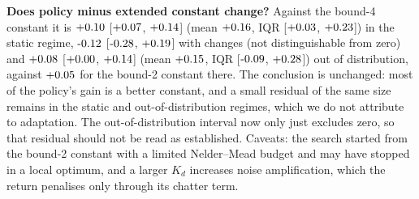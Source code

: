 \textbf{Does policy minus extended constant change?} Against the bound-4 constant it is $+0.10$ [$+0.07$, $+0.14$] (mean $+0.16$, IQR [$+0.03$, $+0.23$]) in the static regime, $\KdBoundChangesPpoBestConstantExtKdfourMed$ [$\KdBoundChangesPpoBestConstantExtKdfourLo$, $+0.19$] with changes (not distinguishable from zero) and $+0.08$ [$+0.00$, $+0.14$] (mean $+0.15$, IQR [$\KdBoundOodPpoBestConstantExtKdfourQone$, $+0.28$]) out of distribution, against $+0.05$ for the bound-2 constant there. The conclusion is unchanged: most of the policy's gain is a better constant, and a small residual of the same size remains in the static and out-of-distribution regimes, which we do not attribute to adaptation. The out-of-distribution interval now only just excludes zero, so that residual should not be read as established. Caveats: the search started from the bound-2 constant with a limited Nelder--Mead budget and may have stopped in a local optimum, and a larger $K_d$ increases noise amplification, which the return penalises only through its chatter term.


